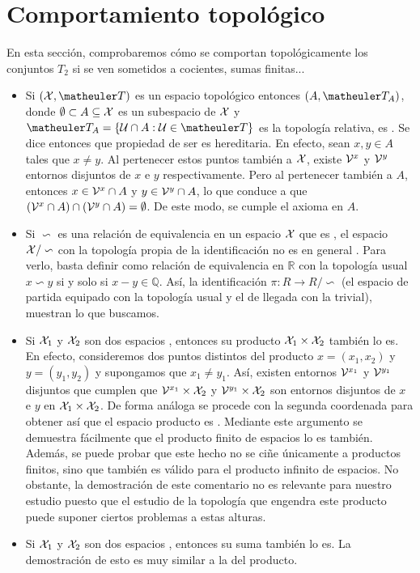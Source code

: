 \section{Comportamiento topológico} 

En esta sección, comprobaremos cómo se comportan topológicamente los conjuntos $T_2$ si se ven sometidos a cocientes, sumas finitas...

\begin{itemize}
\item Si $(\X,\T)$ es un espacio topológico \hausdorff entonces $(A,\T_A)$, donde $\emptyset \subset A \subseteq \mathcal{X}$ es un subespacio de $\mathcal{X}$ y $\T_A=\{\U\cap A: \U\in \T \}$ es la topología relativa, es \hausdorff. Se dice entonces que propiedad de ser \hausdorff es hereditaria. 
En efecto, sean $x,y\in A$ tales que $x\neq y$. Al pertenecer estos puntos también a $\mathcal{X}$, existe $\mathcal{V}^x$ y $\mathcal{V}^y$ entornos disjuntos de $x$ e $y$ respectivamente. Pero al pertenecer también a $A$, entonces $x\in \mathcal{V}^x \cap A$ y $y\in \mathcal{V}^y \cap A$, lo que conduce a que $(\mathcal{V}^x\cap A)\cap (\mathcal{V}^y\cap A)=\emptyset$. De este modo, se cumple el axioma \hausdorff en $A$.  
\item Si $\backsim$ es una relación de equivalencia en un espacio $\mathcal{X}$ que es \hausdorff, el espacio $\mathcal{X}/\backsim$ con la topología propia de la identificación no es en general \hausdorff. Para verlo, basta definir como relación de equivalencia en $\mathbb{R}$ con la topología usual $x\backsim y$ si y solo si $x-y\in \mathbb{Q}$. Así, la identificación $\pi: R\to R/\backsim$ (el espacio de partida equipado con la topología usual y el de llegada con la trivial), muestran lo que buscamos.
\item Si $\mathcal{X}_1$ y $\mathcal{X}_2$ son dos espacios \hausdorff, entonces su producto $\mathcal{X}_1\times \mathcal{X}_2$ también lo es. En efecto, consideremos dos puntos distintos del producto $x=(x_1,x_2)$ y $y=(y_1,y_2)$ y supongamos que $x_1\neq y_1$. Así, existen entornos $\mathcal{V}^{x_1}$ y $\mathcal{V}^{y_1}$ disjuntos que cumplen que $\mathcal{V}^{x_1}\times \mathcal{X}_2$ y $\mathcal{V}^{y_1}\times \mathcal{X}_2$ son entornos disjuntos de $x$ e $y$ en $\mathcal{X}_1\times \mathcal{X}_2$. De forma análoga se procede con la segunda coordenada para obtener así que el espacio producto es \hausdorff. Mediante este argumento se demuestra fácilmente que el producto finito de espacios \hausdorff lo es también. Además, se puede probar que este hecho no se ciñe únicamente a productos finitos, sino que también es válido para el producto infinito de espacios. No obstante, la demostración de este comentario no es relevante para nuestro estudio puesto que el estudio de la topología que engendra este producto puede suponer ciertos problemas a estas alturas.
\item Si $\mathcal{X}_1$ y $\mathcal{X}_2$ son dos espacios \hausdorff, entonces su suma también lo es. La demostración de esto es muy similar a la del producto.
\end{itemize}

